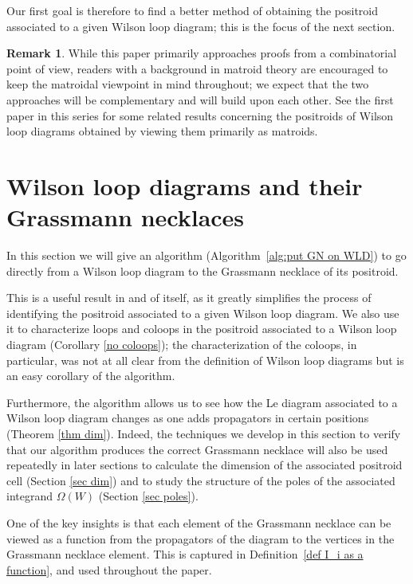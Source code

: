 \documentclass[11pt]{article}
\theoremstyle{remark}
\theoremstyle{definition}
\newtheorem{rmk}[thm]{Remark}
\begin{document}
Our first goal is therefore to find a better method of obtaining the positroid associated to a given Wilson loop diagram; this is the focus of the next section.

\begin{rmk}
While this paper primarily approaches proofs from a combinatorial point of view, readers with a background in matroid theory are encouraged to keep the matroidal viewpoint in mind throughout; we expect that the two approaches will be complementary and will build upon each other. See the first paper in this series \cite{generalcombinatoricsI} for some related results concerning the positroids of Wilson loop diagrams obtained by viewing them primarily as matroids.
\end{rmk}




\section{Wilson loop diagrams and their Grassmann necklaces}\label{sec GN algorithm}



In this section we will give an algorithm (Algorithm~\ref{alg:put GN on WLD}) to go directly from a Wilson loop diagram to the Grassmann necklace of its positroid. 

This is a useful result in and of itself, as it greatly simplifies the process of identifying the positroid associated to a given Wilson loop diagram. We also use it to characterize loops and coloops in the positroid associated to a Wilson loop diagram (Corollary \ref{no coloops}); the characterization of the coloops, in particular, was not at all clear from the definition of Wilson loop diagrams but is an easy corollary of the algorithm.

Furthermore, the algorithm allows us to see how the Le diagram associated to a Wilson loop diagram changes as one adds propagators in certain positions (Theorem \ref{thm dim}). Indeed, the techniques we develop in this section to verify that our algorithm produces the correct Grassmann necklace will also be used repeatedly in later sections to calculate the dimension of the associated positroid cell (Section \ref{sec dim}) and to study the structure of the poles of the associated integrand $\Omega(W)$ (Section \ref{sec poles}).

One of the key insights is that each element of the Grassmann necklace can be viewed as a function from the propagators of the diagram to the vertices in the Grassmann necklace element.  This is captured in Definition~\ref{def I_i as a function}, and used throughout the paper.
\end{document}
